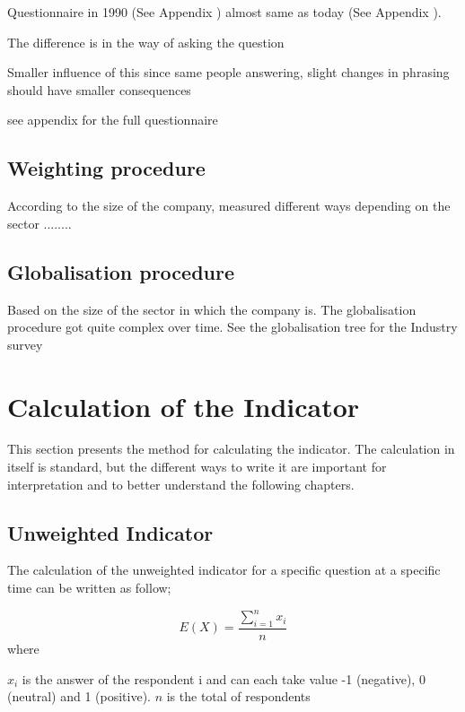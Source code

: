 \documentclass[12pt,a4paper,oneside]{book}
\begin{document}
Questionnaire in 1990 (See Appendix ) almost same as today  (See Appendix ). 

The difference is in the way of asking the question

Smaller influence of this since same people answering, slight changes in phrasing should have smaller consequences

see appendix  for the full questionnaire


\subsection{Weighting procedure}
\label{sec:Weighting procedure}

According to the size of the company, measured different ways depending on the sector ........

\subsection{Globalisation procedure}
\label{sec:Globalisation procedure}
Based on the size of the sector in which the company is.
The globalisation procedure got quite complex over time. See the globalisation tree for the Industry survey 



\section{Calculation of the Indicator}

This section presents the method for calculating the indicator. 
The calculation in itself is standard, but the different ways to write it are important for interpretation and to better understand the following chapters.

\subsection{Unweighted Indicator}

The calculation of the unweighted indicator for a specific question at a specific time can be written as follow;

\begin{equation}
    E(X) = \frac{ \sum_{i=1}^n x_i}{n}
\end{equation} 
where 

$x_i$ is the answer of the respondent i and can each take value -1 (negative), 0 (neutral) and 1 (positive). 
$n$ is the total of respondents
\end{document}
